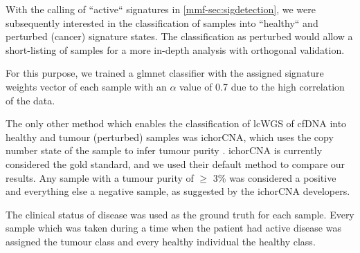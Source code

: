 With the calling of ``active`` signatures in \autoref{mmf-sec:sigdetection}, we were subsequently interested in the classification of samples into ``healthy`` and perturbed (cancer) signature states. The classification as perturbed would allow a short-listing of samples for a more in-depth analysis with orthogonal validation.

For this purpose, we trained a glmnet classifier with the assigned signature weights vector of each sample with an $\alpha$ value of 0.7 due to the high correlation of the data.

The only other method which enables the classification of lcWGS of cfDNA into healthy and tumour (perturbed) samples was ichorCNA, which uses the copy number state of the sample to infer tumour purity  \cite{Adalsteinsson2017}. ichorCNA is currently considered the gold standard, and we used their default method  to compare our results. Any sample with a tumour purity of $\geq$ 3\% was considered a positive and everything else a negative sample, as suggested by the ichorCNA developers.

The clinical status of disease was used as the ground truth for each sample. Every sample which was taken during a time when the patient had active disease was assigned the tumour class and every healthy individual the healthy class.
